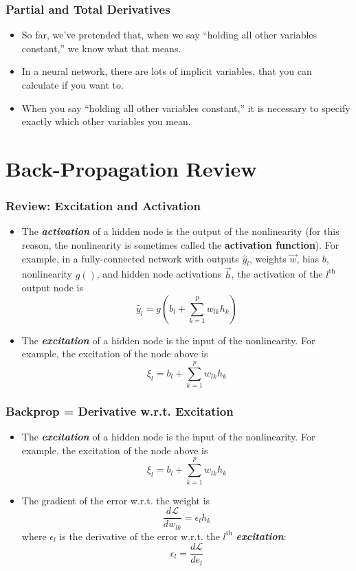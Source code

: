 \documentclass{beamer}
\begin{document}
\begin{frame}
  \frametitle{Partial and Total Derivatives}

  \begin{itemize}
    \item So far, we've pretended that, when we say ``holding all
      other variables constant,'' we know what that means.
    \item In a neural network, there are lots of implicit variables,
      that you can calculate if you want to.
    \item When you say ``holding all other variables constant,'' it is
      necessary to specify exactly which other variables you mean.
  \end{itemize}
\end{frame}

\section[Back-Prop]{Back-Propagation Review}
\setcounter{subsection}{1}

\begin{frame}
  \frametitle{Review: Excitation and Activation}
  \begin{itemize}
    \item The {\bf\em activation} of a hidden node is the output of
      the nonlinearity (for this reason, the nonlinearity is sometimes
      called the {\bf activation function}).  For example, in a
      fully-connected network with outputs $\hat{y}_l$, weights $\vec{w}$,
      bias $b$, nonlinearity $g()$, and hidden node activations
      $\vec{h}$, the activation of the $l^{\textrm{th}}$ output node
      is
      \[
      \hat{y}_l = g\left(b_{l}+\sum_{k=1}^p w_{lk} h_k\right)
      \]
    \item The {\bf\em excitation} of a hidden node is the input of the
      nonlinearity.  For example, the excitation of the node above is
      \[
      \xi_l=b_{l}+\sum_{k=1}^p w_{lk} h_k
      \]
  \end{itemize}
\end{frame}

\begin{frame}
  \frametitle{Backprop = Derivative w.r.t. Excitation}
  \begin{itemize}
    \item The {\bf\em excitation} of a hidden node is the input of the
      nonlinearity.  For example, the excitation of the node above is
      \[
      \xi_l = b_{l}+\sum_{k=1}^p w_{lk} h_k
      \]
    \item The gradient of the error w.r.t. the weight is
      \[
      \frac{d{\mathcal L}}{d w_{lk}} = \epsilon_lh_k
      \]
      where $\epsilon_l$ is the derivative of the error w.r.t. the
      $l^{\textrm{th}}$ {\bf\em excitation}:
      \[
      \epsilon_l = \frac{d{\mathcal L}}{de_l}
      \]
  \end{itemize}
\end{frame}
\end{document}
